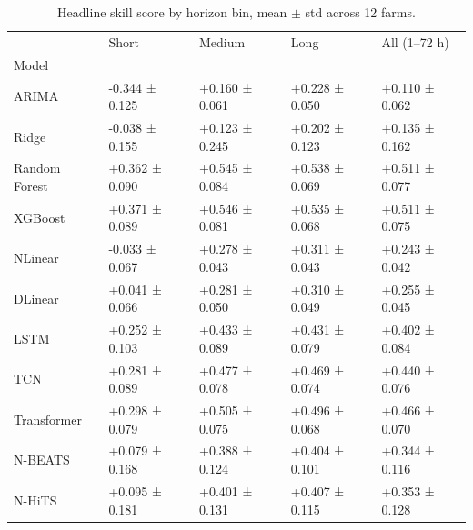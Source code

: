 \begin{table}[ht]
\caption{Headline skill score by horizon bin, mean $\pm$ std across 12 farms.}
\label{tab:headline_skill}
\begin{tabular}{lllll}
\toprule
 & Short & Medium & Long & All (1–72 h) \\
Model &  &  &  &  \\
\midrule
ARIMA & -0.344 ± 0.125 & +0.160 ± 0.061 & +0.228 ± 0.050 & +0.110 ± 0.062 \\
Ridge & -0.038 ± 0.155 & +0.123 ± 0.245 & +0.202 ± 0.123 & +0.135 ± 0.162 \\
Random Forest & +0.362 ± 0.090 & +0.545 ± 0.084 & +0.538 ± 0.069 & +0.511 ± 0.077 \\
XGBoost & +0.371 ± 0.089 & +0.546 ± 0.081 & +0.535 ± 0.068 & +0.511 ± 0.075 \\
NLinear & -0.033 ± 0.067 & +0.278 ± 0.043 & +0.311 ± 0.043 & +0.243 ± 0.042 \\
DLinear & +0.041 ± 0.066 & +0.281 ± 0.050 & +0.310 ± 0.049 & +0.255 ± 0.045 \\
LSTM & +0.252 ± 0.103 & +0.433 ± 0.089 & +0.431 ± 0.079 & +0.402 ± 0.084 \\
TCN & +0.281 ± 0.089 & +0.477 ± 0.078 & +0.469 ± 0.074 & +0.440 ± 0.076 \\
Transformer & +0.298 ± 0.079 & +0.505 ± 0.075 & +0.496 ± 0.068 & +0.466 ± 0.070 \\
N-BEATS & +0.079 ± 0.168 & +0.388 ± 0.124 & +0.404 ± 0.101 & +0.344 ± 0.116 \\
N-HiTS & +0.095 ± 0.181 & +0.401 ± 0.131 & +0.407 ± 0.115 & +0.353 ± 0.128 \\
\bottomrule
\end{tabular}
\end{table}

